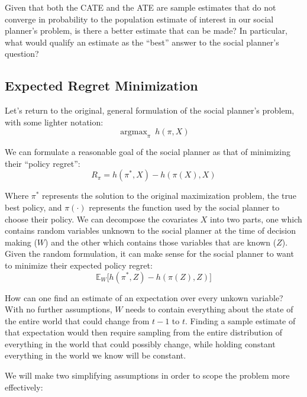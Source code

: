 \documentclass[a4paper,12pt]{article}
\DeclareMathOperator*{\argmax}{argmax}
\begin{document}
Given that both the CATE and the ATE are sample estimates that do not converge in probability to the population estimate of interest in our social planner's problem, is there a better estimate that can be made? In particular, what would qualify an estimate as the ``best'' answer to the social planner's question?

\subsection*{Expected Regret Minimization}

Let's return to the original, general formulation of the social planner's problem, with some lighter notation:
%
$$
\argmax_{\pi} \  h(\pi, X)
$$

We can formulate a reasonable goal of the social planner as that of minimizing their ``policy regret'':
%
$$
R_{\pi} = h(\pi^*, X) - h(\pi(X), X)
$$

Where $\pi^*$ represents the solution to the original maximization problem, the true best policy, and $\pi(\cdot)$ represents the function used by the social planner to choose their policy. We can decompose the covariates $X$ into two parts, one which contains random variables unknown to the social planner at the time of decision making ($W$) and the other which contains those variables that are known ($Z$). Given the random formulation, it can make sense for the social planner to want to minimize their expected policy regret:
%
$$
\mathbb{E}_W \big[ h(\pi^*, Z) - h(\pi(Z), Z)  \big]
$$

How can one find an estimate of an expectation over every unkown variable? With no further assumptions, $W$ needs to contain everything about the state of the entire world that could change from $t-1$ to $t$. Finding a sample estimate of that expectation would then require sampling from the entire distribution of everything in the world that could possibly change, while holding constant everything in the world we know will be constant.

We will make two simplifying assumptions in order to scope the problem more effectively:
\end{document}
